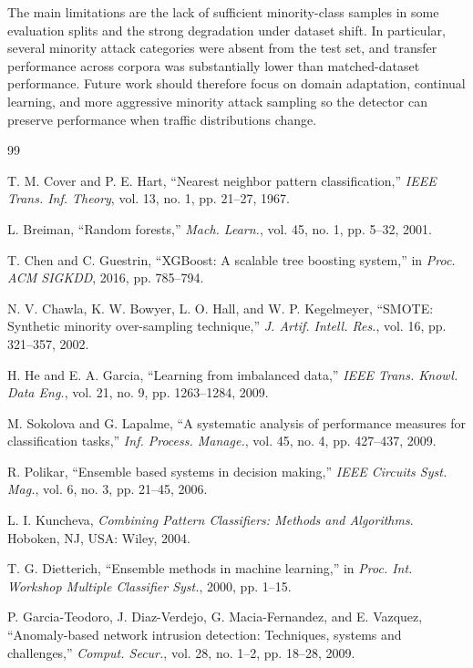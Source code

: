\documentclass[conference]{IEEEtran}
\begin{document}
The main limitations are the lack of sufficient minority-class samples in some evaluation splits and the strong degradation under dataset shift. In particular, several minority attack categories were absent from the test set, and transfer performance across corpora was substantially lower than matched-dataset performance. Future work should therefore focus on domain adaptation, continual learning, and more aggressive minority attack sampling so the detector can preserve performance when traffic distributions change.

\balance

\begin{thebibliography}{99}

T. M. Cover and P. E. Hart, ``Nearest neighbor pattern classification,'' \textit{IEEE Trans. Inf. Theory}, vol. 13, no. 1, pp. 21--27, 1967.

L. Breiman, ``Random forests,'' \textit{Mach. Learn.}, vol. 45, no. 1, pp. 5--32, 2001.

T. Chen and C. Guestrin, ``XGBoost: A scalable tree boosting system,'' in \textit{Proc. ACM SIGKDD}, 2016, pp. 785--794.

N. V. Chawla, K. W. Bowyer, L. O. Hall, and W. P. Kegelmeyer, ``SMOTE: Synthetic minority over-sampling technique,'' \textit{J. Artif. Intell. Res.}, vol. 16, pp. 321--357, 2002.

H. He and E. A. Garcia, ``Learning from imbalanced data,'' \textit{IEEE Trans. Knowl. Data Eng.}, vol. 21, no. 9, pp. 1263--1284, 2009.

M. Sokolova and G. Lapalme, ``A systematic analysis of performance measures for classification tasks,'' \textit{Inf. Process. Manage.}, vol. 45, no. 4, pp. 427--437, 2009.

R. Polikar, ``Ensemble based systems in decision making,'' \textit{IEEE Circuits Syst. Mag.}, vol. 6, no. 3, pp. 21--45, 2006.

L. I. Kuncheva, \textit{Combining Pattern Classifiers: Methods and Algorithms}. Hoboken, NJ, USA: Wiley, 2004.

T. G. Dietterich, ``Ensemble methods in machine learning,'' in \textit{Proc. Int. Workshop Multiple Classifier Syst.}, 2000, pp. 1--15.

P. Garcia-Teodoro, J. Diaz-Verdejo, G. Macia-Fernandez, and E. Vazquez, ``Anomaly-based network intrusion detection: Techniques, systems and challenges,'' \textit{Comput. Secur.}, vol. 28, no. 1--2, pp. 18--28, 2009.


\end{thebibliography}
\end{document}
